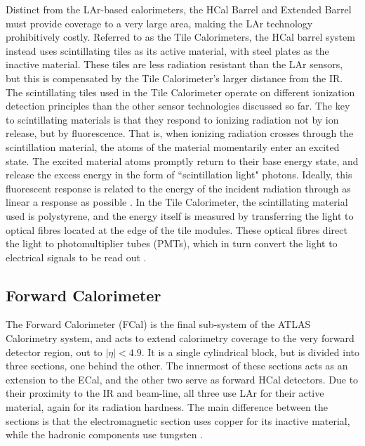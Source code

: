         Distinct from the LAr-based calorimeters, the HCal Barrel and Extended Barrel must provide coverage to a very large area, making the LAr technology prohibitively costly.
        Referred to as the Tile Calorimeters, the HCal barrel system instead uses scintillating tiles as its active material, with steel plates as the inactive material.
        These tiles are less radiation resistant than the LAr sensors, but this is compensated by the Tile Calorimeter's larger distance from the IR.
        The scintillating tiles used in the Tile Calorimeter operate on different ionization detection principles than the other sensor technologies discussed so far.
        The key to scintillating materials is that they respond to ionizing radiation not by ion release, but by fluorescence.
        That is, when ionizing radiation crosses through the scintillation material, the atoms of the material momentarily enter an excited state.
        The excited material atoms promptly return to their base energy state, and release the excess energy in the form of ``scintillation light" photons.
        Ideally, this fluorescent response is related to the energy of the incident radiation through as linear a response as possible \cite{wiley_radiation_detection}.
        In the Tile Calorimeter, the scintillating material used is polystyrene, and the energy itself is measured by transferring the light to optical fibres located at the edge of the tile modules.
        These optical fibres direct the light to photomultiplier tubes (PMTs), which in turn convert the light to electrical signals to be read out \cite{tcal_tdr}.

    \subsection{Forward Calorimeter}
        The Forward Calorimeter (FCal) is the final sub-system of the ATLAS Calorimetry system, and acts to extend calorimetry coverage to the very forward detector region, out to $|\eta| < 4.9$.
        It is a single cylindrical block, but is divided into three sections, one behind the other.
        The innermost of these sections acts as an extension to the ECal, and the other two serve as forward HCal detectors.
        Due to their proximity to the IR and beam-line, all three use LAr for their active material, again for its radiation hardness.
        The main difference between the sections is that the electromagnetic section uses copper for its inactive material, while the hadronic components use tungsten \cite{Lar_cal_tdr}.

